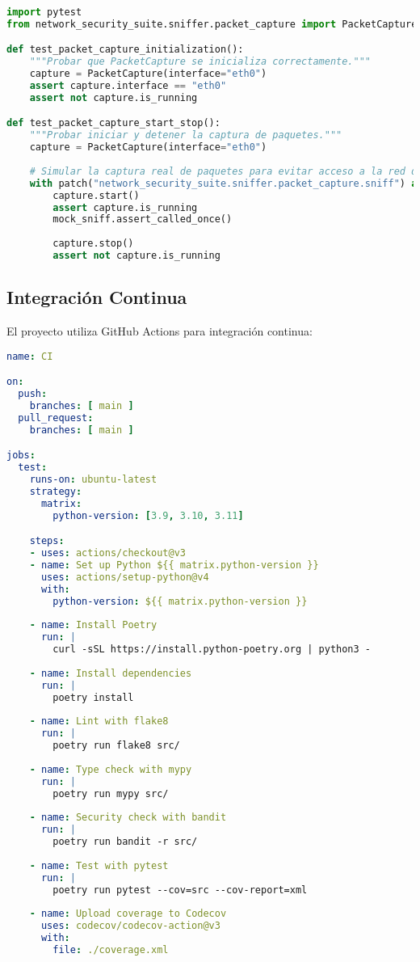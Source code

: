 \begin{lstlisting}[language=python, caption=Ejemplo de Prueba]
import pytest
from network_security_suite.sniffer.packet_capture import PacketCapture

def test_packet_capture_initialization():
    """Probar que PacketCapture se inicializa correctamente."""
    capture = PacketCapture(interface="eth0")
    assert capture.interface == "eth0"
    assert not capture.is_running

def test_packet_capture_start_stop():
    """Probar iniciar y detener la captura de paquetes."""
    capture = PacketCapture(interface="eth0")
    
    # Simular la captura real de paquetes para evitar acceso a la red durante las pruebas
    with patch("network_security_suite.sniffer.packet_capture.sniff") as mock_sniff:
        capture.start()
        assert capture.is_running
        mock_sniff.assert_called_once()
        
        capture.stop()
        assert not capture.is_running
\end{lstlisting}

\subsection{Integración Continua}
El proyecto utiliza GitHub Actions para integración continua:

\begin{lstlisting}[language=yaml, caption=Ejemplo de Flujo de Trabajo de GitHub]
name: CI

on:
  push:
    branches: [ main ]
  pull_request:
    branches: [ main ]

jobs:
  test:
    runs-on: ubuntu-latest
    strategy:
      matrix:
        python-version: [3.9, 3.10, 3.11]

    steps:
    - uses: actions/checkout@v3
    - name: Set up Python ${{ matrix.python-version }}
      uses: actions/setup-python@v4
      with:
        python-version: ${{ matrix.python-version }}
    
    - name: Install Poetry
      run: |
        curl -sSL https://install.python-poetry.org | python3 -
    
    - name: Install dependencies
      run: |
        poetry install
    
    - name: Lint with flake8
      run: |
        poetry run flake8 src/
    
    - name: Type check with mypy
      run: |
        poetry run mypy src/
    
    - name: Security check with bandit
      run: |
        poetry run bandit -r src/
    
    - name: Test with pytest
      run: |
        poetry run pytest --cov=src --cov-report=xml
    
    - name: Upload coverage to Codecov
      uses: codecov/codecov-action@v3
      with:
        file: ./coverage.xml
\end{lstlisting}

